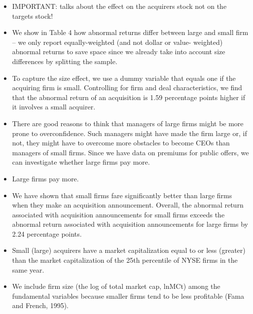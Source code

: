 \documentclass[12pt]{article}
\begin{document}
    \begin{itemize}

        \item IMPORTANT: \citet{Moeller2004} talks about the effect on the acquirers stock not on the targets stock! 
        \item We show in Table 4 how abnormal returns differ between large and small firm \citep{Moeller2004} -- we only report equally-weighted (and not dollar or value- weighted) abnormal returns to save space since we already take into account size differences by splitting the sample. 

        \item To capture the size effect, we use a dummy variable that equals one if the acquiring firm is small. Controlling for firm and deal characteristics, we find that the abnormal return of an acquisition is 1.59 percentage points higher if it involves a small acquirer. \citep{Moeller2004}

        \item There are good reasons to think that managers of large firms might be more prone to overconfidence. Such managers might have made the firm large or, if not, they might have to overcome more obstacles to become CEOs than managers of small firms. Since we have data on premiums for public offers, we can investigate whether large firms pay more. \citep{Moeller2004}

        \item Large firms pay more. \citep{Moeller2004}

        \item We have shown that small firms fare significantly better than large firms when they make an acquisition announcement. Overall, the abnormal return associated with acquisition announcements for small firms exceeds the abnormal return associated with acquisition announcements for large firms by 2.24 percentage points.\citep{Moeller2004}

        \item Small (large) acquirers have a market capitalization equal to or less (greater) than the market capitalization of the 25th percentile of NYSE firms in the same year. \citep{Moeller2004}

        \item We include firm size (the log of total market cap, lnMCt) among the fundamental variables because smaller firms tend to be less profitable (Fama and French, 1995).\citep{Fama2006}


    \end{itemize}
\end{document}
